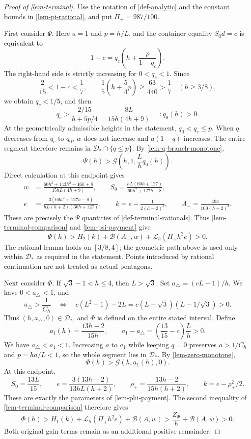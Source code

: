 \documentclass[11pt,a4paper]{article}
\theoremstyle{proofmanuscript}
\begin{document}
\begin{proof}[Proof of \ref{lem-terminal}]

Use the notation of \ref{def-analytic} and the constant bounds in \ref{lem-pi-rational}, and put \(\Pi_+=987/100\).

First consider \(\Psi\). Here \(a=1\) and \(p=h/L\), and the container equality \(S_0d=c\) is equivalent to \[
1-c=q_c\left(h+\frac{p}{1-q_c}\right).
\] The right-hand side is strictly increasing for \(0<q_c<1\). Since \[
\frac2{15}<1-c<\frac17,\qquad
\frac15\left(h+\frac54p\right)\ge\frac{63}{440}>\frac17
\quad(h\ge3/8),
\] we obtain \(q_c<1/5\), and then \[
q_c>\frac{2/15}{h+5p/4}
=\frac{8L}{15h(4h+9)}=:q_0(h)>0.
\] At the geometrically admissible heights in the statement, \(q_0<q_c\le p\). When \(q\) decreases from \(q_c\) to \(q_0\), \(w\) does not increase and \(a(1-q)\) increases. The entire segment therefore remains in \(\mathcal D_*\cap\{q\le p\}\). By \ref{lem-q-branch-monotone}, \[
\Psi(h)>\mathcal G\left(h,1,\frac Lh q_0(h)\right).
\] Direct calculation at this endpoint gives \[
\begin{aligned}
w&=\frac{60h^3+143h^2+16h+8}{15hL(4h+9)},\qquad
S_0=\frac{hL(60h+127)}{60h^2+127h-8},\\
e&=\frac{3(60h^2+127h-8)}{hL(h+2)(60h+127)},\qquad
k=e-\frac1{2(h+2)^2},\qquad A_- =\frac{493}{100(h+2)^2}.
\end{aligned}
\] These are precisely the \(\Psi\) quantities of \ref{def-terminal-rationals}. Thus \ref{lem-terminal-comparison} and \ref{lem-psi-payment} give \[
\Psi(h)>H_2(k)+\mathcal B(A_-,w)+\mathcal L_h(\Pi_+h^2e)>0.
\] The rational lemma holds on \([3/8,4]\); the geometric path above is used only within \(\mathcal D_*\) as required in the statement. Points introduced by rational continuation are not treated as actual pentagons.

Next consider \(\Phi\). If \(\sqrt3-1<h\le4\), then \(L>\sqrt3\). Set \(a_\triangle=(cL-1)/h\). We have \(0<a_\triangle<1\), and \[
a_\triangle>\frac1{C_h}\quad\Longleftrightarrow\quad
c(L^2+1)-2L=c(L-\sqrt3)(L-1/\sqrt3)>0.
\] Thus \((h,a_\triangle,0)\in\mathcal D_*\), and \(\Phi\) is defined on the entire stated interval. Define \[
a_1(h)=\frac{13h-2}{15h},\qquad
a_1-a_\triangle=\left(\frac{13}{15}-c\right)\frac Lh>0.
\] We have \(a_\triangle<a_1<1\). Increasing \(a\) to \(a_1\) while keeping \(q=0\) preserves \(a>1/C_h\) and \(p=ha/L<1\), so the whole segment lies in \(\mathcal D_*\). By \ref{lem-zero-monotone}, \[
\Phi(h)>\mathcal G(h,a_1(h),0).
\] At this endpoint, \[
S_0=\frac{13L}{15},\qquad
e=\frac{3(13h-2)}{13hL(h+2)},\qquad
\rho_+=\frac{13h-2}{15h(h+2)},\qquad k=e-\rho_+^2/2.
\] These are exactly the parameters of \ref{lem-phi-payment}. The second inequality of \ref{lem-terminal-comparison} therefore gives \[
\Phi(h)>H_1(k)+\mathcal L_h(\Pi_+h^2e)+\mathcal B(A,w)
>\frac{Z_\Phi}{h}+\mathcal B(A,w)>0.
\] Both original gain terms remain as an additional positive remainder.


\end{proof}
\end{document}
